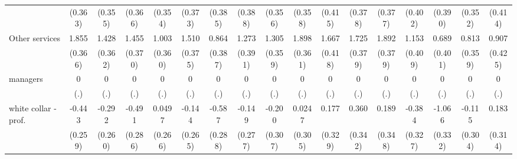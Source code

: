 {\begin{tabular}{l*{16}{c}}
                    &     (0.363)         &     (0.355)         &     (0.366)         &     (0.354)         &     (0.373)         &     (0.385)         &     (0.388)         &     (0.356)         &     (0.358)         &     (0.415)         &     (0.378)         &     (0.377)         &     (0.402)         &     (0.390)         &     (0.352)         &     (0.414)         \\
[1em]
Other services      &       1.855\sym{***}&       1.428\sym{***}&       1.455\sym{***}&       1.003\sym{**} &       1.510\sym{***}&       0.864\sym{*}  &       1.273\sym{**} &       1.305\sym{***}&       1.898\sym{***}&       1.667\sym{***}&       1.725\sym{***}&       1.892\sym{***}&       1.153\sym{**} &       0.689         &       0.813\sym{*}  &       0.907\sym{*}  \\
                    &     (0.366)         &     (0.362)         &     (0.370)         &     (0.360)         &     (0.375)         &     (0.387)         &     (0.391)         &     (0.359)         &     (0.361)         &     (0.418)         &     (0.379)         &     (0.379)         &     (0.409)         &     (0.401)         &     (0.359)         &     (0.425)         \\
[1em]
managers            &           0         &           0         &           0         &           0         &           0         &           0         &           0         &           0         &           0         &           0         &           0         &           0         &           0         &           0         &           0         &           0         \\
                    &         (.)         &         (.)         &         (.)         &         (.)         &         (.)         &         (.)         &         (.)         &         (.)         &         (.)         &         (.)         &         (.)         &         (.)         &         (.)         &         (.)         &         (.)         &         (.)         \\
[1em]
white collar - prof.&      -0.443         &      -0.292         &      -0.491         &      0.0497         &      -0.144         &      -0.587\sym{*}  &      -0.149         &      -0.200         &      0.0247         &       0.177         &       0.360         &       0.189         &      -0.384         &      -1.066\sym{**} &      -0.115         &       0.183         \\
                    &     (0.259)         &     (0.260)         &     (0.286)         &     (0.266)         &     (0.265)         &     (0.288)         &     (0.277)         &     (0.307)         &     (0.305)         &     (0.329)         &     (0.342)         &     (0.348)         &     (0.327)         &     (0.332)         &     (0.304)         &     (0.314)         \\

\end{tabular}}
